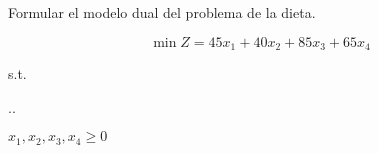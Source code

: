 \documentclass[spanish,letterpaper,11pt]{exam}
\author{Dr. Rafael Torres Escobar}
\begin{document}
\begin{questions}
    \question
    Formular el modelo dual del problema de la dieta.

   \[ \min Z = 45x_1 + 40x_2 + 85x_3 + 65x_4   \]

    {\centering
      s.t.  %
      
    
      \sysdelim..%

    $x_1, x_2, x_3, x_4 \geq 0$
  \par}

  \begin{solution}
  
  \end{solution}
\end{questions}
\end{document}

